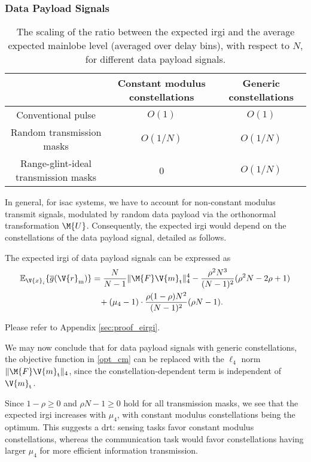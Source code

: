 \documentclass[journal,a4paper,10pt, romanappendices]{IEEEtran}
\begin{document}
\subsubsection{Data Payload Signals}
\begin{table*}[t]
\caption{The scaling of the ratio between the expected \ac{irgi} and the average expected mainlobe level (averaged over delay bins), with respect to $N$, for different data payload signals.}
    \label{tab:eirgi_scaling}
    \centering
    \begin{tabular}{|c|c|c|} \hline
         & Constant modulus constellations & Generic constellations \\ \hline
        Conventional pulse & $O(1)$ & $O(1)$ \\ \hline
        Random transmission masks & $O(1/N)$ & $O(1/N)$ \\ \hline
        Range-glint-ideal transmission masks & 0 & $O(1/N)$ \\ \hline
    \end{tabular}
    \vspace{-4mm}
\end{table*}
In general, for \ac{isac} systems, we have to account for non-constant modulus transmit signals, modulated by random data payload via the orthonormal transformation $\M{U}$. Consequently, the expected \ac{irgi} would depend on the constellations of the data payload signal, detailed as follows.

\begin{proposition}\label{prop:eirgi}
The expected \ac{irgi} of data payload signals can be expressed as
\begin{align}\label{eirgi_data}
\mathbb{E}_{\V{x}_i}\{\overline{g}(\V{r}_{\rm m})\}
&=\frac{N}{N-1}\|\M{F}\V{m}_{\rm t}\|_4^4-\frac{\rho^2 N^3}{(N-1)^2}(\rho^2 N -2\rho +1) \nonumber \\
&\hspace{3mm}+(\mu_4-1)\cdot \frac{\rho(1-\rho) N^2}{(N-1)^2}(\rho N-1).
\end{align}
\begin{IEEEproof}
Please refer to Appendix \ref{sec:proof_eirgi}.
\end{IEEEproof}
\end{proposition}

We may now conclude that for data payload signals with generic constellations, the objective function in \eqref{opt_cm} can be replaced with the $\ell_4$ norm $\|\M{F}\V{m}_{\rm t}\|_4$, since the constellation-dependent term is independent of $\V{m}_{\rm t}$.
\begin{remark}
Since $1-\rho \geq 0$ and $\rho N-1 \geq 0$ hold for all transmission masks, we see that the expected \ac{irgi} increases with $\mu_4$, with constant modulus constellations being the optimum. This suggests a \ac{drt}: sensing tasks favor constant modulus constellations, whereas the communication task would favor constellations having larger $\mu_4$ for more efficient information transmission.
\end{remark}
\end{document}
